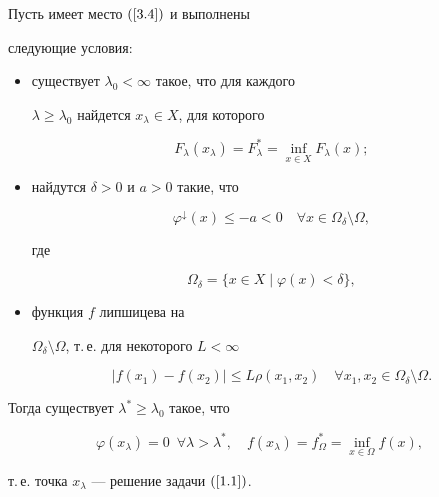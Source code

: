 \begin{thms}\label{T4.1}


Пусть имеет место $(\ref{3.4})$ и выполнены


следующие условия\/${:}$


\begin{itemize}


\item[1)] существует $\lambda_0 < \infty$ такое, что для каждого


$\lambda \geq \lambda_0$ найдется $x_{\lambda}\in X$, для которого


$$




F_{\lambda}(x_{\lambda}) = F^{*}_{\lambda} = \inf\limits_{x\in


X}F_{\lambda}(x);




$$


\item[2)] найдутся $\delta > 0$ и $a > 0$ такие, что


\begin{equation}\label{4.2}


\varphi^{\downarrow}(x)\leq - a < 0\quad\forall


x\in\Omega_{\delta}\setminus \Omega,


\end{equation}


где


$$




\Omega_{\delta} = \{x\in X \mid \varphi(x) < \delta\},




$$


\item[3)] функция $f$ липшицева на


$\Omega_{\delta}\setminus \Omega$, т.\,е. для некоторого $L < \infty$


\begin{equation}\label{4.4}


\vert f(x_1) - f(x_2)\vert \leq L\rho(x_1,x_2)\quad \forall


x_1, x_2 \in \Omega_{\delta}\setminus\Omega.


\end{equation}


\end{itemize}


Тогда существует $\lambda^{*}\geq \lambda_0$ такое, что


$$


\varphi(x_{\lambda}) = 0\ \; \forall \lambda > \lambda^{*},\quad


f(x_{\lambda}) = f^{*}_{\Omega} = \inf\limits_{x\in\Omega}f(x),


$$


т.\,е. точка $x_{\lambda}$ --- решение задачи $(\ref{1.1})$.


\end{thms}

